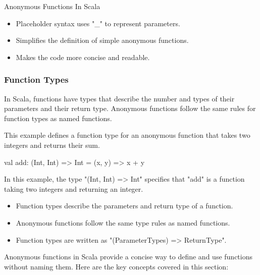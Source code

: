 \begin{notes}{Anonymous Functions In Scala}
\begin{highlight}
        \begin{itemize}
            \item Placeholder syntax uses "\_" to represent parameters.
            \item Simplifies the definition of simple anonymous functions.
            \item Makes the code more concise and readable.
        \end{itemize}
    
    \end{highlight}
    
    \subsubsection*{Function Types}
    
    In Scala, functions have types that describe the number and types of their parameters and their return type. Anonymous functions follow the same rules for function types as named functions.
    
    \begin{highlight}
    
        This example defines a function type for an anonymous function that takes two integers and returns their sum.
    
    \begin{code}[Scala]
    val add: (Int, Int) => Int = (x, y) => x + y
    \end{code}
    
        In this example, the type "(Int, Int) => Int" specifies that "add" is a function taking two integers and returning an integer.
    
        \begin{itemize}
            \item Function types describe the parameters and return type of a function.
            \item Anonymous functions follow the same type rules as named functions.
            \item Function types are written as "(ParameterTypes) => ReturnType".
        \end{itemize}
    
    \end{highlight}
    
    \begin{highlight}
    
        Anonymous functions in Scala provide a concise way to define and use functions without naming them. Here are the key concepts covered in this section:
        

\end{highlight}
\end{notes}
